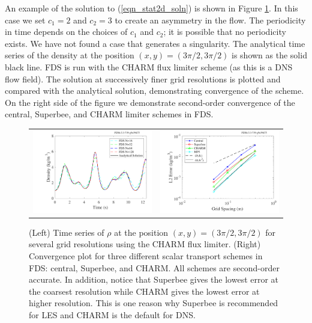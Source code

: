 \documentclass[11pt]{book}
\begin{document}
An example of the solution to (\ref{eqn_stat2d_soln}) is shown in Figure \ref{fig_compression_wave}.  In this case we set $c_1 = 2$ and $c_2 = 3$ to create an asymmetry in the flow.  The periodicity in time depends on the choices of $c_1$ and $c_2$; it is possible that no periodicity exists. We have not found a case that generates a singularity. The analytical time series of the density at the position $(x,y) = (3\pi/2, 3\pi/2)$ is shown as the solid black line. FDS is run with the CHARM flux limiter scheme (as this is a DNS flow field).  The solution at successively finer grid resolutions is plotted and compared with the analytical solution, demonstrating convergence of the scheme.  On the right side of the figure we demonstrate second-order convergence of the central, Superbee, and CHARM limiter schemes in FDS.

\begin{figure}[t]
   \begin{tabular}{rl}
      \includegraphics[width=3.2in]{SCRIPT_FIGURES/compression_wave_time_series.pdf} &
      \includegraphics[width=3.2in]{SCRIPT_FIGURES/compression_wave_convergence.pdf}
   \end{tabular}
   \caption[Stationary compression wave convergence]{(Left) Time series of $\rho$ at the position $(x,y) = (3\pi/2, 3\pi/2)$ for several grid resolutions using the CHARM flux limiter. (Right) Convergence plot for three different scalar transport schemes in FDS: central, Superbee, and CHARM.  All schemes are second-order accurate.  In addition, notice that Superbee gives the lowest error at the coarsest resolution while CHARM gives the lowest error at higher resolution.  This is one reason why Superbee is recommended for LES and CHARM is the default for DNS.}
   \label{fig_compression_wave}
\end{figure}
\end{document}
